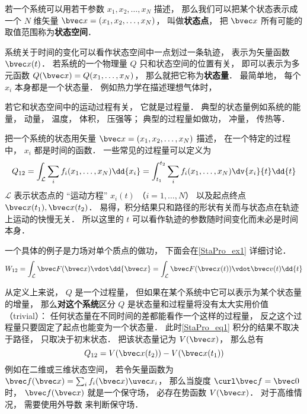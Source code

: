 

若一个系统可以用若干参数 $x_1, x_2,  \dots, x_N$ 描述， 那么我们可以把某个状态表示成一个 $N$ 维矢量 $\bvec x = (x_1, x_2, \dots, x_N)$， 叫做\textbf{状态点}， 把 $\bvec x$ 所有可能的取值范围称为\textbf{状态空间}．

系统关于时间的变化可以看作状态空间中一点划过一条轨迹， 表示为矢量函数 $\bvec x(t)$． 若系统的一个物理量 $Q$ 只和状态空间的位置有关， 即可以表示为多元函数 $Q(\bvec x) = Q(x_1, \dots, x_N)$， 那么就把它称为\textbf{状态量}． 最简单地， 每个 $x_i$ 本身都是一个状态量． 例如热力学在描述理想气体时， 

 若它和状态空间中的运动过程有关， 它就是过程量． 典型的状态量例如系统的能量， 动量， 温度， 体积， 压强等； 典型的过程量如做功， 冲量， 传热等．

把一个系统的状态用矢量 $\bvec x = (x_1, x_2, \dots, x_N)$ 描述， 在一个特定的过程中， $x_i$ 都是时间的函数． 一些常见的过程量可以定义为
\begin{equation}\label{StaPro_eq1}
Q_{12} = \int_{\mathcal L} \sum_i f_i(x_1, \dots, x_N) \dd{x_i} = \int_{t_1}^{t_2} \sum_i f_i(x_1, \dots, x_N) \dv{x_i}{t} \dd{t}
\end{equation}
$\mathcal L$ 表示状态点的 “运动方程” $x_i(t)$ （$i = 1,\dots, N$） 以及起点终点 $\bvec x(t_1), \bvec x(t_2)$． 易得，积分结果只和路径的形状有关而与状态点在轨迹上运动的快慢无关． 所以这里的 $t$ 可以看作轨迹的参数随时间变化而未必是时间本身．

一个具体的例子是力场对单个质点的做功， 下面会在\autoref{StaPro_ex1} 详细讨论．
\begin{equation}
W_{12} = \int_{\mathcal L} \bvec F(\bvec x) \vdot \dd{\bvec x} = \int_{\mathcal L} \bvec F(\bvec x(t)) \vdot \bvec v(t) \dd{t}
\end{equation}


从定义上来说， $Q$ 是一个过程量， 但如果在某个系统中它可以表示为某个状态量的增量， 那么\textbf{对这个系统}区分 $Q$ 是状态量和过程量将没有太大实用价值（trivial）： 任何状态量在不同时间的差都能看作一个这样的过程量， 反之这个过程量只要固定了起点也能变为一个状态量． 此时\autoref{StaPro_eq1} 积分的结果不取决于路径， 只取决于初末状态． 把该状态量记为 $V(\bvec x)$， 那么总有
\begin{equation}
Q_{12} = V(\bvec x(t_2)) - V(\bvec x(t_1))
\end{equation}
例如在二维或三维状态空间， 若令矢量函数为 $\bvec f(\bvec x) = \sum_i f_i(\bvec x) \uvec x_i$， 那么当旋度 $\curl \bvec f = \bvec 0$ 时， $\bvec f(\bvec x)$ 就是一个保守场， 必存在势函数 $V(\bvec x)$． 对于高维情况， 需要使用外导数 来判断保守场．

